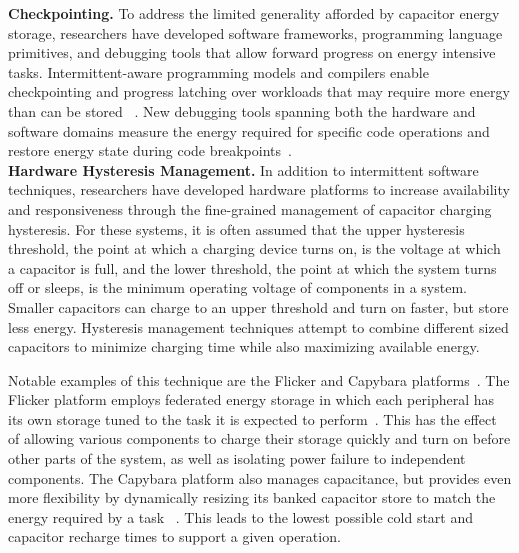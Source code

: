\noindent
\textbf{Checkpointing.}
To address the limited generality afforded by capacitor energy storage, researchers have developed software frameworks, programming language primitives, and debugging tools that allow forward progress on energy intensive tasks. 
Intermittent-aware programming
models and compilers enable checkpointing and progress latching over
workloads that may require more energy than can be stored
~\cite{lucia2015simpler, ransford2012mementos, hesterTimely17}. 
New debugging tools
spanning both the hardware and software domains
measure the energy required for specific code operations
and restore energy state during code breakpoints~\cite{colin2016energy}.
\\

\noindent
\textbf{Hardware Hysteresis Management.}
In addition to intermittent software techniques, researchers have developed
hardware platforms to
increase availability and responsiveness through the fine-grained management
of capacitor charging hysteresis.
For these systems,
it is often assumed that the upper hysteresis threshold, the point at which a
charging device turns on, is the voltage at which a capacitor is full, and the
lower threshold, the point at which the system turns off or sleeps, is the minimum
operating voltage of components in a system.
Smaller capacitors can charge to an upper
threshold and turn on faster, but store less energy.  Hysteresis management
techniques attempt to combine different sized capacitors to
minimize charging time while also maximizing available energy.

Notable examples of this technique are the Flicker and Capybara platforms~\cite{hesterFlicker17, colinReconfigurable18}.
The Flicker
platform employs federated
energy storage in which each peripheral has its own storage tuned to the task
it is expected to perform~\cite{hesterTragedy15,hesterFlicker17}. This has the
effect of allowing various components to charge their storage quickly and turn on before other parts of the system, as well
as isolating power failure to independent components.  
The Capybara platform also manages capacitance,  
but provides even more flexibility by dynamically resizing its banked
capacitor store to match the energy required by a task
~\cite{colinReconfigurable18}. This leads to the lowest possible cold start and capacitor recharge times to support a given operation.

